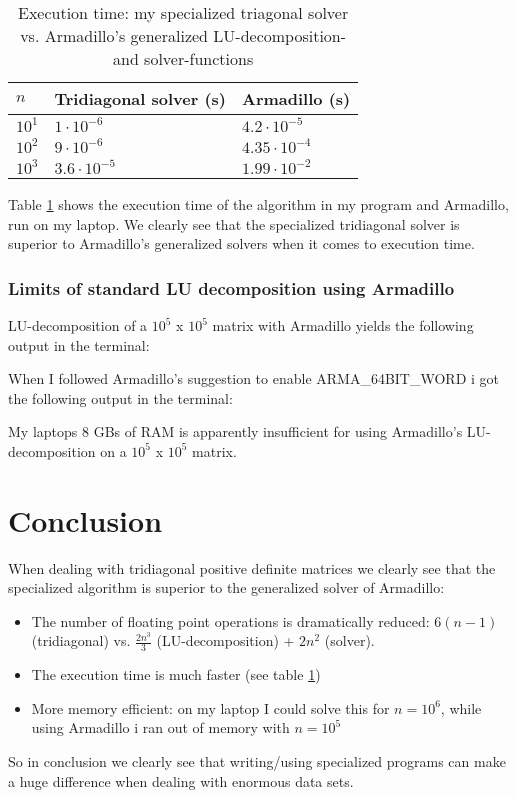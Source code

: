 \documentclass[norsk,a4paper,12pt]{article}
\begin{document}
\begin{table}[ht!]
	\caption{Execution time: my specialized triagonal solver vs. Armadillo's generalized LU-decomposition- and solver-functions}
    \begin{tabular}{|l|l|l|}
    \hline
    $n$     & Tridiagonal solver (s)  & Armadillo (s)  \\ \hline
    $10^1$ & $1 \cdot 10^{-6}$                & $4.2 \cdot 10^{-5}$      \\ \hline
    $10^2$ & $9 \cdot 10^{-6}$                & $4.35 \cdot 10^{-4}$      \\ \hline
    $10^3$ & $3.6 \cdot 10^{-5}$              & $1.99 \cdot 10^{-2}$      \\ \hline
    \end{tabular}
    \label{tab:exec_time}
\end{table}

Table \ref{tab:exec_time} shows the execution time of the algorithm in my program and Armadillo, run on my laptop. We clearly see that the specialized tridiagonal solver is superior to Armadillo's generalized solvers when it comes to execution time. 

\subsubsection*{Limits of standard LU decomposition using Armadillo}

LU-decomposition of a $10^5$ x $10^5$ matrix with Armadillo yields the following output in the terminal:


When I followed Armadillo's suggestion to enable ARMA\_64BIT\_WORD i got the following output in the terminal:


My laptops 8 GBs of RAM is apparently insufficient for using Armadillo's LU-decomposition on a $10^5$ x $10^5$ matrix.


\section{Conclusion}
When dealing with tridiagonal positive definite matrices we clearly see that the specialized algorithm is superior to the generalized solver of Armadillo:
\begin{itemize}
\item The number of floating point operations is dramatically reduced: $6(n-1)$ (tridiagonal) vs. $\frac{2n^3}{3}$ (LU-decomposition) + $2n^2$ (solver).
\item The execution time is much faster (see table \ref{tab:exec_time})
\item More memory efficient: on my laptop I could solve this for $n=10^6$, while using Armadillo i ran out of memory with $n=10^5$
\end{itemize}

So in conclusion we clearly see that writing/using specialized programs can make a huge difference when dealing with enormous data sets.
\end{document}
